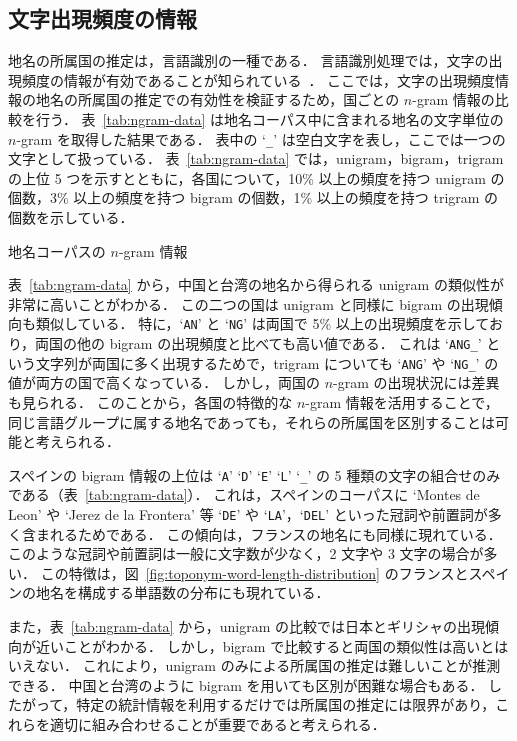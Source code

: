 \documentclass[japanese]{jnlp_1.4}
\begin{document}
\subsection{文字出現頻度の情報}
\label{sec:ngram-data}

地名の所属国の推定は，言語識別の一種である．
言語識別処理では，文字の出現頻度の情報が有効であることが知られている~\cite{dunning94,Lins04}．
ここでは，文字の出現頻度情報の地名の所属国の推定での有効性を検証するため，国ごとの $n$-gram 情報の比較を行う．
表~\ref{tab:ngram-data} は地名コーパス中に含まれる地名の文字単位の $n$-gram を取得した結果である．
表中の `\texttt{\_}' は空白文字を表し，ここでは一つの文字として扱っている．
表~\ref{tab:ngram-data} では，unigram，bigram，trigram の上位 5 つを示すとともに，各国について，10\% 以上の頻度を持つ unigram の個数，3\% 以上の頻度を持つ bigram の個数，1\% 以上の頻度を持つ trigram の個数を示している．

\begin{table}[b]
 \caption{地名コーパスの $n$-gram 情報}
 \label{tab:ngram-data}

\end{table}

表~\ref{tab:ngram-data} から，中国と台湾の地名から得られる unigram の類似性が非常に高いことがわかる．
この二つの国は unigram と同様に bigram の出現傾向も類似している．
特に，`\texttt{AN}' と `\texttt{NG}' は両国で 5\% 以上の出現頻度を示しており，両国の他の bigram の出現頻度と比べても高い値である．
これは `\texttt{ANG\_}' という文字列が両国に多く出現するためで，trigram についても `\texttt{ANG}' や `\texttt{NG\_}' の値が両方の国で高くなっている．
しかし，両国の $n$-gram の出現状況には差異も見られる．
このことから，各国の特徴的な $n$-gram 情報を活用することで，同じ言語グループに属する地名であっても，それらの所属国を区別することは可能と考えられる．

スペインの bigram 情報の上位は `\texttt{A}' `\texttt{D}' `\texttt{E}' `\texttt{L}' `\texttt{\_}' の 5 種類の文字の組合せのみである（表~\ref{tab:ngram-data}）．
これは，スペインのコーパスに `Montes de Leon' や `Jerez de la Frontera' 等 `\texttt{DE}' や `\texttt{LA}'，`\texttt{DEL}' といった冠詞や前置詞が多く含まれるためである．
この傾向は，フランスの地名にも同様に現れている．
このような冠詞や前置詞は一般に文字数が少なく，2 文字や 3 文字の場合が多い．
この特徴は，図~\ref{fig:toponym-word-length-distribution} のフランスとスペインの地名を構成する単語数の分布にも現れている．

また，表~\ref{tab:ngram-data} から，unigram の比較では日本とギリシャの出現傾向が近いことがわかる．
しかし，bigram で比較すると両国の類似性は高いとはいえない．
これにより，unigram のみによる所属国の推定は難しいことが推測できる．
中国と台湾のように bigram を用いても区別が困難な場合もある．
したがって，特定の統計情報を利用するだけでは所属国の推定には限界があり，これらを適切に組み合わせることが重要であると考えられる．
\end{document}
